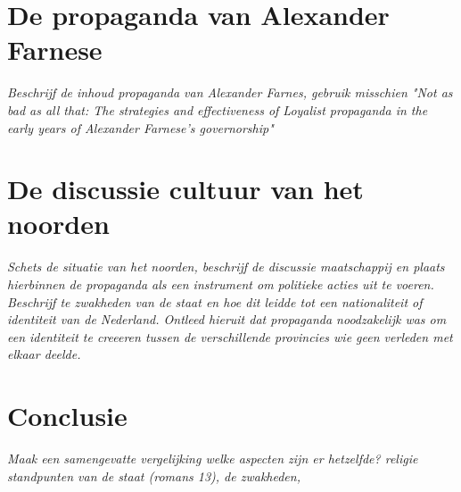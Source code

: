\documentclass[11pt]{amsart}
\begin{document}
\section{De propaganda van Alexander Farnese}
\textit{Beschrijf de inhoud propaganda van Alexander Farnes, gebruik misschien "Not as bad as all that: The strategies and effectiveness of Loyalist propaganda in the early years of Alexander Farnese's governorship"}

\section{De discussie cultuur van het noorden}
\textit{Schets de situatie van het noorden, beschrijf de discussie maatschappij en plaats hierbinnen de propaganda als een
     instrument om politieke acties uit te voeren. Beschrijf te zwakheden van de staat en hoe dit leidde tot een nationaliteit of identiteit van de Nederland. Ontleed hieruit dat propaganda noodzakelijk was om een identiteit te creeeren tussen de verschillende provincies wie geen verleden met elkaar deelde. }

\section{Conclusie}
\textit{Maak een samengevatte vergelijking welke aspecten zijn er hetzelfde? religie standpunten van de staat (romans 13), de zwakheden, }

\newpage\printbibliography{}
\end{document}
